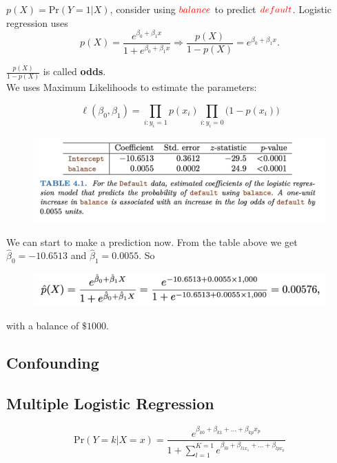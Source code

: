 \documentclass{article}
\begin{document}
$p(X) = \mathrm{Pr}(Y = 1 \vert X)$, consider using $\color{red}{balance}$ to predict $\color{red}{default}$. Logistic regression uses $$p(X) = \frac{e^{\beta_0 + \beta_1 x}}{1 + e^{\beta_0 + \beta_1 x}} \Longrightarrow \frac{p(X)}{1-p(X)} = e^{\beta_0 + \beta_1 x}.$$

$\displaystyle \frac{p(X)}{1 - p(X)}$ is called \textbf{odds}.\\

We uses Maximum Likelihoods to estimate the parameters:

$$\displaystyle\ell(\beta_0, \beta_1) = \prod_{i:y_i = 1}p(x_i)\prod_{i:y_i = 0}\Big(1 - p(x_i)\Big)$$

\begin{figure}[h!]
    \centering
    \includegraphics[width=0.75\linewidth]{GLM_result.png}
    \label{GLM-logistic}
\end{figure}

We can start to make a prediction now. From the table above we get $\hat{\beta}_0 = -10.6513$ and $\hat{\beta}_1 = 0.0055$. So 

\newpage

\begin{figure}
    \centering
    \includegraphics[width=0.75\linewidth]{calculation_logistic.png}
    \label{calculation-logistic}
\end{figure}

with a balance of $\$1000$.

\subsection{Confounding}

\subsection{Multiple Logistic Regression}

$$\mathrm{Pr}(Y = k \vert X = x) = \frac{e^{\beta_{k0} + \beta_{k1} + \dots + \beta_{kp}x_p}}{1 + \sum_{l=1}^{K=1}e^{\beta_{l0} + \beta_{l1x_1} + \dots + \beta_{lp x_p}}}$$
\end{document}
